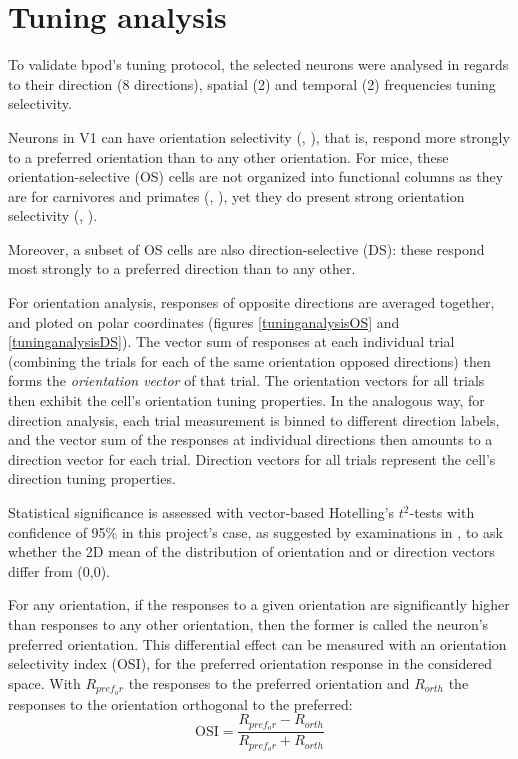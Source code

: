 \section{Tuning analysis}

To validate bpod's tuning protocol, the selected neurons were analysed in regards to their direction (8 directions), spatial (2) and temporal (2) frequencies tuning selectivity.

Neurons in V1 can have orientation selectivity (\cite{Hubel1959}, \cite{Hubel1962}), that is, respond more strongly to a preferred orientation than to any other orientation. For mice, these orientation-selective (OS) cells are not organized into functional columns as they are for carnivores and primates (\cite{Hubel1962}, \cite{Hubel1968}), yet they do present strong orientation selectivity (\cite{Girman1999}, \cite{Ohki2005}). 

Moreover, a subset of  OS cells are also direction-selective (DS): these respond most strongly to a preferred direction than to any other.

For orientation analysis, responses of opposite directions are averaged together, and ploted on polar coordinates (figures \ref{tuninganalysisOS} and \ref{tuninganalysisDS}). The vector sum of responses at each individual trial (combining the trials for each of the same orientation opposed directions) then forms the \textit{orientation vector} of that trial. The orientation vectors for all trials then exhibit the cell's orientation tuning properties.
In the analogous way, for direction analysis, each trial measurement is binned to different direction labels, and the vector sum of the responses at individual directions then amounts to a direction vector for each trial. Direction vectors for all trials represent the cell's direction tuning properties.

Statistical significance is assessed with vector-based Hotelling's $t^2$-tests with confidence of 95\% in this project's case, as suggested by examinations in \cite{Mazurek2014}, to ask whether the 2D mean of the distribution of orientation and or direction vectors differ from (0,0).
 
 For any orientation, if the responses to a given orientation are significantly higher than responses to any other orientation, then the former is called the neuron's preferred orientation. This differential effect can be measured with an orientation selectivity index (OSI), for the preferred orientation response in the considered space. With  $R_{pref_or}$ the responses to the preferred orientation and $R_{orth}$ the responses to the orientation orthogonal to the preferred:
\begin{equation}
\text{OSI}= \dfrac{R_{pref_or} - R_{orth}}{R_{pref_or} + R_{orth}}
\end{equation}

